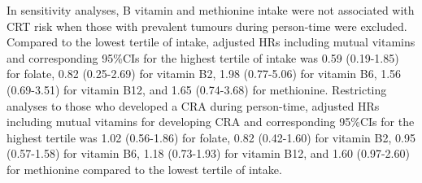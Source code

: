 \noindent In sensitivity analyses, B vitamin and methionine intake were not associated with CRT risk when those with prevalent tumours during person-time were excluded. Compared to the lowest tertile of intake, adjusted HRs including mutual vitamins and corresponding 95\%CIs for the highest tertile of intake was 0.59 (0.19-1.85) for folate, 0.82 (0.25-2.69) for vitamin B2, 1.98 (0.77-5.06) for vitamin B6, 1.56 (0.69-3.51) for vitamin B12, and 1.65 (0.74-3.68) for methionine. Restricting analyses to those who developed a CRA during person-time, adjusted HRs including mutual vitamins for developing CRA and corresponding 95\%CIs for the highest tertile was 1.02 (0.56-1.86) for folate, 0.82 (0.42-1.60) for vitamin B2, 0.95 (0.57-1.58) for vitamin B6, 1.18 (0.73-1.93) for vitamin B12, and 1.60 (0.97-2.60) for methionine compared to the lowest tertile of intake.


